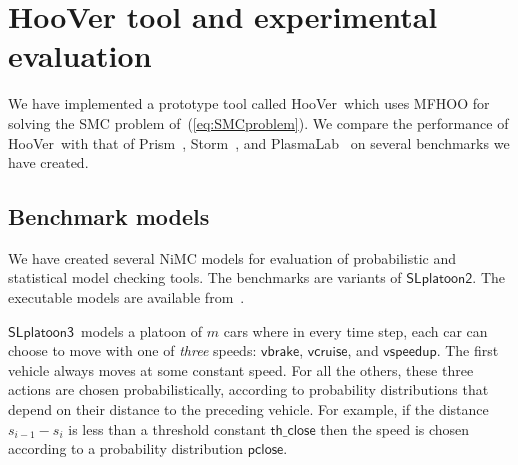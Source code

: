 \documentclass[11pt]{article}
\theoremstyle{definition}
\newcommand{\sayan}[1]{\textcolor{blue}{#1}}
\newcommand{\modelname}{NiMC\xspace}
\newcommand{\SlplatoonTwo}{{$\mathsf{SLplatoon2}$\xspace}}
\newcommand{\SlplatoonThree}{{$\mathsf{SLplatoon3}$\xspace}}
\newcommand{\toolname}{{{\sf HooVer}\xspace}}
\begin{document}



%
\section{\toolname{} tool and experimental evaluation}
\label{sec:experiments}
We have implemented a prototype tool called
\toolname\ which uses MFHOO for solving the SMC problem of~(\ref{eq:SMCproblem}). We  compare the performance of \toolname\ with that of  Prism~\cite{HKNP06}, Storm~\cite{dehnert2017storm}, and PlasmaLab~\cite{legay2016plasma} on several benchmarks we have created.

\subsection{Benchmark models}
\label{sec:allbenchmarks}
We have created several \modelname models for evaluation of probabilistic and statistical model checking tools. The benchmarks are variants of \SlplatoonTwo. The executable models are available from~\cite{SMCOO-online:2020}.

\SlplatoonThree\ models a platoon of $m$ cars where in every time step, each car can choose to move with one of {\em three\/} speeds: $\mathsf{vbrake}$, $\mathsf{vcruise}$, and $\mathsf{vspeedup}$.
The first vehicle always moves at some constant speed. For all the others, these three actions are chosen probabilistically, according to probability distributions that depend on their distance to the preceding vehicle.
%
For example, if the distance $s_{i-1} - s_i$ is less than a threshold constant $\mathsf{th\_close}$ then the speed is chosen according to a probability distribution $\mathsf{pclose}$.
\end{document}
